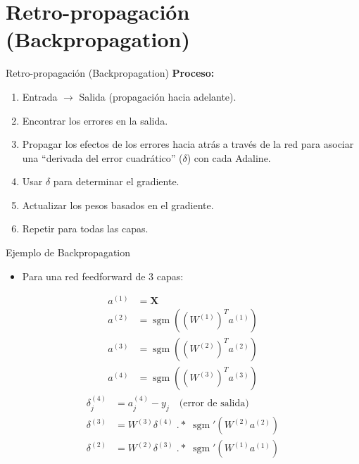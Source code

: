 \documentclass[aspectratio=169,utf8,spanish]{beamer}
\DeclareMathOperator{\sgm}{sgm}
\begin{document}
\section{Retro-propagación (Backpropagation)}

\begin{frame}{Retro-propagación (Backpropagation)}
  \textbf{Proceso:}
  \begin{enumerate}
    \item Entrada $\to$ Salida (propagación hacia adelante).
    \item Encontrar los errores en la salida.
    \item Propagar los efectos de los errores hacia atrás a través de la red para asociar una ``derivada del error cuadrático'' ($\delta$) con cada Adaline.
    \item Usar $\delta$ para determinar el gradiente.
    \item Actualizar los pesos basados en el gradiente.
    \item Repetir para todas las capas.
  \end{enumerate}
\end{frame}

\begin{frame}{Ejemplo de Backpropagation}
  \begin{itemize}
    \item Para una red feedforward de 3 capas:
  \end{itemize}
  \begin{align*}
    a^{(1)} &= \mathbf{X} \\
    a^{(2)} &= \sgm((W^{(1)})^T a^{(1)}) \\
    a^{(3)} &= \sgm((W^{(2)})^T a^{(2)}) \\
    a^{(4)} &= \sgm((W^{(3)})^T a^{(3)})
  \end{align*}
  \begin{align*}
    \delta_j^{(4)} &= a_j^{(4)} - y_j \quad \text{(error de salida)} \\
    \delta^{(3)} &= W^{(3)} \delta^{(4)} \;.\!*\; \sgm'(W^{(2)} a^{(2)}) \\
    \delta^{(2)} &= W^{(2)} \delta^{(3)} \;.\!*\; \sgm'(W^{(1)} a^{(1)})
  \end{align*}
\end{frame}

\end{document}
